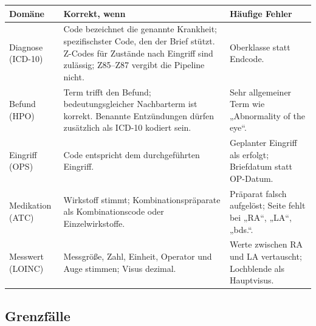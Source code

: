 \documentclass[11pt,a4paper,parskip=half-,headings=standardclasses,toc=bibliography,open=any]{scrreprt}
\begin{document}
\begin{tabularx}{\textwidth}{@{}P{2.7cm}LL@{}}
\toprule
\textbf{Domäne} & \textbf{Korrekt, wenn} & \textbf{Häufige Fehler}\\
\midrule
Diagnose (ICD-10) & Code bezeichnet die genannte Krankheit; spezifischster Code, den der Brief stützt. Z-Codes für Zustände nach Eingriff sind zulässig; Z85--Z87 vergibt die Pipeline nicht. & Oberklasse statt Endcode.\\
Befund (HPO) & Term trifft den Befund; bedeutungsgleicher Nachbarterm ist korrekt. Benannte Entzündungen dürfen zusätzlich als ICD-10 kodiert sein. & Sehr allgemeiner Term wie „Abnormality of the eye“.\\
Eingriff (OPS) & Code entspricht dem durchgeführten Eingriff. & Geplanter Eingriff als erfolgt; Briefdatum statt OP-Datum.\\
Medikation (ATC) & Wirkstoff stimmt; Kombinationspräparate als Kombinationscode oder Einzelwirkstoffe. & Präparat falsch aufgelöst; Seite fehlt bei „RA“, „LA“, „bds.“.\\
Messwert (LOINC) & Messgröße, Zahl, Einheit, Operator und Auge stimmen; Visus dezimal. & Werte zwischen RA und LA vertauscht; Lochblende als Hauptvisus.\\
\bottomrule
\end{tabularx}

\subsection*{Grenzfälle}
\end{document}
